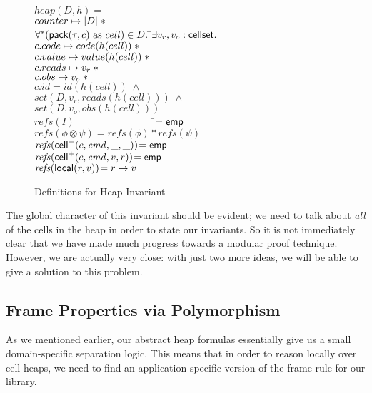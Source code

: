 \begin{figure}
\begin{tabbing}
$heap(D,h) = $ \\
\;\;$counter \mapsto |D| \;* $ \\
\;\;$\forall^* (\mathsf{pack}({\tau}, {c})\mbox{ as }cell) \in D.\;$\=$\exists v_r, v_o : \mathsf{cellset}.\;$ \\
                         \>$c.code \mapsto code(h(cell))   \;* $ \\
                         \>$c.value \mapsto value(h(cell)) \;* $ \\
                         \>$c.reads \mapsto v_r \;* $ \\
                         \>$c.obs   \mapsto v_o \;* $ \\
                         \>$c.id    = id(h(cell)) \;\land$ \\
                         \>$set(D, v_r, reads(h(cell))) \;\land$ \\
                         \>$set(D, v_o, obs(h(cell)))$ \\[1em]

$\mathit{refs}(I) \qquad\qquad\qquad\qquad$\=$= \mathsf{emp}$ \\
$\mathit{refs}(\phi \otimes \psi) $\>$= \mathit{refs}(\phi) * \mathit{refs}(\psi)$ \\
$\mathit{refs}(\mathsf{cell}^{-}({c}, {\mathit{cmd}}, {\_}, {\_})) $\>$= \mathsf{emp}$ \\
$\mathit{refs}(\mathsf{cell}^{+}({c}, {\mathit{cmd}}, {v}, {r})) $\>$= \mathsf{emp}$ \\
$\mathit{refs}(\mathsf{local}({r}, {v})) $\>$= r \mapsto v$ \\
\end{tabbing}

\caption{Definitions for Heap Invariant}
\label{heap-invariant}
\end{figure}

The global character of this invariant should be evident; we need to
talk about \emph{all} of the cells in the heap in order to state our
invariants. So it is not immediately clear that we have made much
progress towards a modular proof technique. However, we are actually
very close: with just two more ideas, we will be able to give a
solution to this problem.

\subsection{Frame Properties via Polymorphism}

As we mentioned earlier, our abstract heap formulas essentially give
us a small domain-specific separation logic. This means that in order
to reason locally over cell heaps, we need to find an
application-specific version of the frame rule for our library. 

